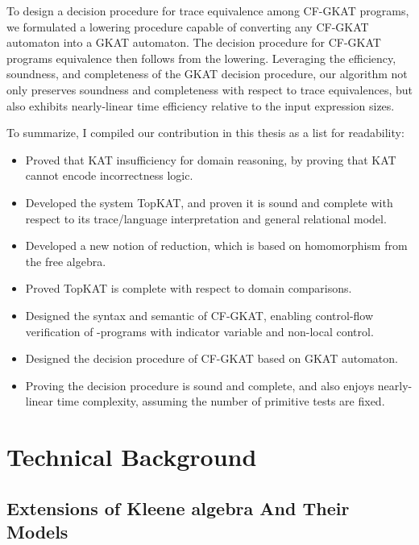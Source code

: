 To design a decision procedure for trace equivalence among CF-GKAT programs, we formulated a lowering procedure capable of converting any CF-GKAT automaton into a GKAT automaton.
The decision procedure for CF-GKAT programs equivalence then follows from the lowering.
Leveraging the efficiency, soundness, and completeness of the GKAT decision procedure, our algorithm not only preserves soundness and completeness with respect to trace equivalences, but also exhibits nearly-linear time efficiency relative to the input expression sizes.

To summarize, I compiled our contribution in this thesis as a list for readability:
\begin{itemize}
    \item Proved that KAT insufficiency for domain reasoning, by proving that KAT cannot encode incorrectness logic.
    \item Developed the system TopKAT, and proven it is sound and complete with respect to its trace/language interpretation and general relational model.
    \item Developed a new notion of reduction, which is based on homomorphism from the free algebra.
    \item Proved TopKAT is complete with respect to domain comparisons.
    \item Designed the syntax and semantic of CF-GKAT, enabling control-flow verification of -programs with indicator variable and non-local control.
    \item Designed the decision procedure of CF-GKAT based on GKAT automaton.
    \item Proving the decision procedure is sound and complete, and also enjoys nearly-linear time complexity, assuming the number of primitive tests are fixed.
\end{itemize}

\section{Technical Background}

\subsection{Extensions of Kleene algebra And Their Models}

